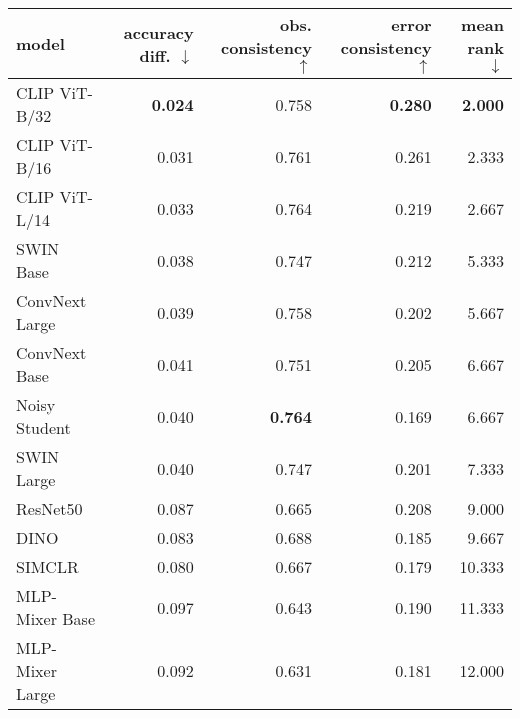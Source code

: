 \begin{tabular}{lrrrr}
\toprule
          model & accuracy diff. $\downarrow$ & obs. consistency $\uparrow$ & error consistency $\uparrow$ & mean rank $\downarrow$ \\
\midrule
  CLIP ViT-B/32 &              \textbf{0.024} &                       0.758 &               \textbf{0.280} &         \textbf{2.000} \\
  CLIP ViT-B/16 &                       0.031 &                       0.761 &                        0.261 &                  2.333 \\
  CLIP ViT-L/14 &                       0.033 &                       0.764 &                        0.219 &                  2.667 \\
      SWIN Base &                       0.038 &                       0.747 &                        0.212 &                  5.333 \\
 ConvNext Large &                       0.039 &                       0.758 &                        0.202 &                  5.667 \\
  ConvNext Base &                       0.041 &                       0.751 &                        0.205 &                  6.667 \\
  Noisy Student &                       0.040 &              \textbf{0.764} &                        0.169 &                  6.667 \\
     SWIN Large &                       0.040 &                       0.747 &                        0.201 &                  7.333 \\
       ResNet50 &                       0.087 &                       0.665 &                        0.208 &                  9.000 \\
           DINO &                       0.083 &                       0.688 &                        0.185 &                  9.667 \\
         SIMCLR &                       0.080 &                       0.667 &                        0.179 &                 10.333 \\
 MLP-Mixer Base &                       0.097 &                       0.643 &                        0.190 &                 11.333 \\
MLP-Mixer Large &                       0.092 &                       0.631 &                        0.181 &                 12.000 \\
\bottomrule
\end{tabular}

